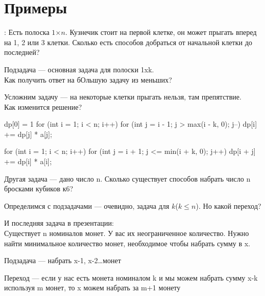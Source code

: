 \section{Примеры}

\begin{frame}
    : Есть полоска $1$×$n$. Кузнечик стоит на первой клетке, он может прыгать вперед на 1, 2 или 3 клетки. Сколько есть способов добраться от начальной клетки до последней?
\end{frame}

\begin{frame}
    Подзадача --- основная задача для полоски 1xk.\\
    Как получить ответ на бОльшую задачу из меньших?
\end{frame}

\begin{frame}
    Усложним задачу --- на некоторые клетки прыгать нельзя, там препятствие.\\
    Как изменится решение?
\end{frame}

\begin{frame}[fragile]
    \begin{cpp}
dp[0] = 1
for (int i = 1; i < n; i++) {
    for (int j = i - 1; j > max(i - k, 0); j--) {
        dp[i] += dp[j] * a[j];
    }
}

for (int i = 1; i < n; i++) {
    for (int j = i + 1; j <= min(i + k, 0); j++) {
        dp[i + j] += dp[i] * a[i];
    }
}
    \end{cpp}
\end{frame}

\begin{frame}
    Другая задача --- дано число n. Сколько существует способов набрать число n бросками кубиков к6?
\end{frame}

\begin{frame}
    \quad Определимся с подзадачами --- очевидно, задача для $k$($k \le n$).
    Но какой переход?
\end{frame}

\begin{frame}
    И последняя задача в презентации:\\
    Существует n номиналов монет. У вас их неограниченное количество. Нужно найти минимальное количество монет, необходимое чтобы набрать сумму в x.
\end{frame}

\begin{frame}
    Подзадача --- набрать x-1, x-2\dots монет
\end{frame}

\begin{frame}
    Переход --- если у нас есть монета номиналом k и мы можем набрать сумму x-k используя m монет, то x можем набрать за m+1 монету
\end{frame}